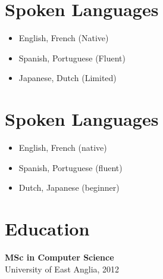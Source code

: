 \documentclass[a4paper,10pt]{article}
\begin{document}
{\begin{minipage}[t]{0.32\textwidth}
{\begin{minipage}[t][\textheight]{\dimexpr\textwidth-10pt}
        \section*{\color{lightblue} Spoken Languages}
        \begin{itemize}[leftmargin=1em, nosep]
            \item English, French (Native)
            \item Spanish, Portuguese (Fluent)
            \item Japanese, Dutch (Limited)
        \end{itemize}

        \section*{\color{lightblue} Spoken Languages}
        \begin{itemize}[leftmargin=1em, nosep]
            \item English, French (native)
            \item Spanish, Portuguese (fluent)
            \item Dutch, Japanese (beginner)
        \end{itemize}

        \section*{\color{lightblue} Education}
        \textbf{MSc in Computer Science} \\
        University of East Anglia, 2012
        \vfill %
    \end{minipage}%
    }
\end{minipage}%
\vfill %
}%
\end{document}
